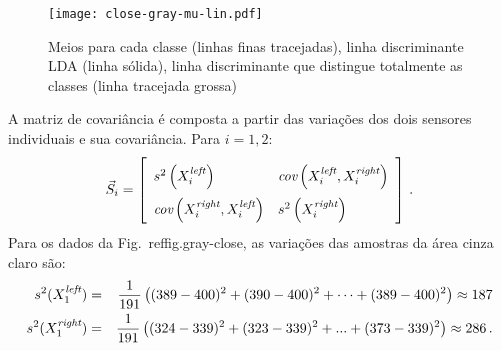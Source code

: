 \begin{figure}
\begin{center}
\texttt{[image: close-gray-mu-lin.pdf]}
\end{center}
\caption{Meios para cada classe (linhas finas tracejadas), linha discriminante LDA (linha sólida), linha discriminante que distingue totalmente as classes (linha tracejada grossa)}\label{fig.gray-close-mu-lin}
\end{figure}

A matriz de covariância é composta a partir das variações dos dois sensores individuais e sua covariância. Para $i=1,2$:
\[
\vec{S}_i = \left[
\renewcommand{\arraystretch}{2}
\begin{array}{l@{\hspace{1em}}l}
s^2\left(X_i^{\sub{left}}\right) &
\textit{cov}\left(X_i^{\sub{left}}, X_i^{\sub{right}}\right)\\
\textit{cov}\left(X_i^{\sub{right}},X_i^{\sub{left}}\right)&
s^2\left(X_i^{\sub{right}}\right)
\end{array}
\right]\,.
\]
Para os dados da Fig.~ref{fig.gray-close}, as variações das amostras da área cinza claro são:
\begin{eqnarray*}
s^2(X_1^{\textit{\scriptsize left}}) &=& \frac{1}{191} \left((389 - 400)^2 + (390 - 400)^2 + \cdots + (389 - 400)^2 \right) \approx 187 \\
s^2(X_1^{\textit{\scriptsize right}}) &=& \frac{1}{191} \left((324 - 339)^2 + (323 - 339)^2 + ... + (373 - 339)^2 \right) \approx 286\,.
\end{eqnarray*}

